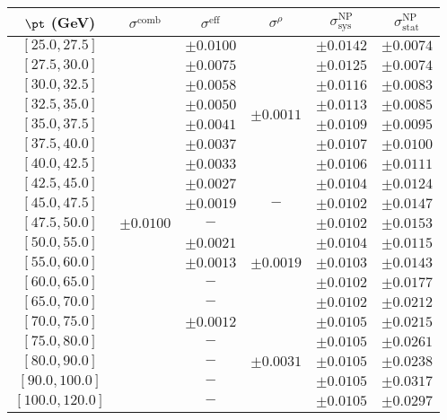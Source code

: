 \begin{tabular}{c||c|c|c||c|c}
$\pt$ (GeV) & $\sigma^{\text{comb}}$ & $\sigma^{\text{eff}}$ & $\sigma^\rho$ & $\sigma_{\text{sys}}^{\text{NP}}$ & $\sigma_{\text{stat}}^{\text{NP}}$ \\
\hline
$[25.0, 27.5]$ & \multirow{19}{*}{$\pm0.0100$} & $\pm0.0100$ & \multirow{8}{*}{$\pm0.0011$} & $\pm0.0142$ & $\pm0.0074$\\
$[27.5, 30.0]$ &  & $\pm0.0075$ &  & $\pm0.0125$ & $\pm0.0074$\\
$[30.0, 32.5]$ &  & $\pm0.0058$ &  & $\pm0.0116$ & $\pm0.0083$\\
$[32.5, 35.0]$ &  & $\pm0.0050$ &  & $\pm0.0113$ & $\pm0.0085$\\
$[35.0, 37.5]$ &  & $\pm0.0041$ &  & $\pm0.0109$ & $\pm0.0095$\\
$[37.5, 40.0]$ &  & $\pm0.0037$ &  & $\pm0.0107$ & $\pm0.0100$\\
$[40.0, 42.5]$ &  & $\pm0.0033$ &  & $\pm0.0106$ & $\pm0.0111$\\
$[42.5, 45.0]$ &  & $\pm0.0027$ &  & $\pm0.0104$ & $\pm0.0124$\\\cline{4-4}
$[45.0, 47.5]$ &  & $\pm0.0019$ & \multirow{1}{*}{$-$} & $\pm0.0102$ & $\pm0.0147$\\\cline{4-4}
$[47.5, 50.0]$ &  & $-$ & \multirow{5}{*}{$\pm0.0019$} & $\pm0.0102$ & $\pm0.0153$\\
$[50.0, 55.0]$ &  & $\pm0.0021$ &  & $\pm0.0104$ & $\pm0.0115$\\
$[55.0, 60.0]$ &  & $\pm0.0013$ &  & $\pm0.0103$ & $\pm0.0143$\\
$[60.0, 65.0]$ &  & $-$ &  & $\pm0.0102$ & $\pm0.0177$\\
$[65.0, 70.0]$ &  & $-$ &  & $\pm0.0102$ & $\pm0.0212$\\\cline{4-4}
$[70.0, 75.0]$ &  & $\pm0.0012$ & \multirow{5}{*}{$\pm0.0031$} & $\pm0.0105$ & $\pm0.0215$\\
$[75.0, 80.0]$ &  & $-$ &  & $\pm0.0105$ & $\pm0.0261$\\
$[80.0, 90.0]$ &  & $-$ &  & $\pm0.0105$ & $\pm0.0238$\\
$[90.0, 100.0]$ &  & $-$ &  & $\pm0.0105$ & $\pm0.0317$\\
$[100.0, 120.0]$ &  & $-$ &  & $\pm0.0105$ & $\pm0.0297$\\
\end{tabular}
